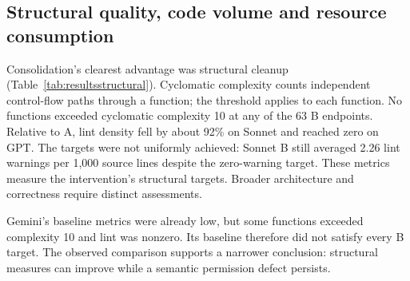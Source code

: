 \FloatBarrier
\subsection{Structural quality, code volume and resource consumption}\label{sec:resultsstructural}

Consolidation's clearest advantage was structural cleanup
(Table~\ref{tab:resultsstructural}). Cyclomatic complexity counts independent
control-flow paths through a function; the threshold applies to each function.
No functions exceeded cyclomatic
complexity 10 at any of the 63 B endpoints. Relative to A, lint density
fell by about 92\% on Sonnet and reached zero on GPT\@. The targets were
not uniformly achieved: Sonnet B still averaged 2.26 lint warnings per
1,000 source lines despite the zero-warning target. These metrics
measure the intervention's structural targets. Broader architecture and
correctness require distinct assessments.

Gemini's baseline metrics were already low, but some functions exceeded
complexity 10 and lint was nonzero. Its baseline therefore did not satisfy
every B target. The observed comparison supports a narrower conclusion:
structural measures can improve while a semantic permission defect persists.


